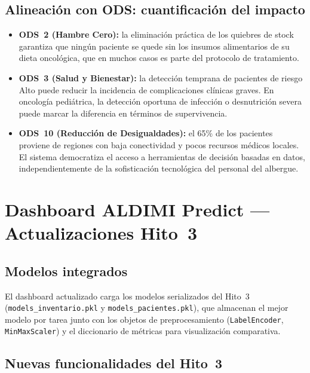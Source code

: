 \documentclass[12pt, a4paper]{article}
\begin{document}
\subsection{Alineaci\'on con ODS: cuantificaci\'on del impacto}

\begin{itemize}[leftmargin=1.5em, itemsep=4pt]
  \item \textbf{ODS~2 (Hambre Cero):} la eliminaci\'on pr\'actica de los quiebres de stock garantiza que ning\'un paciente se quede sin los insumos alimentarios de su dieta oncol\'ogica, que en muchos casos es parte del protocolo de tratamiento.
  \item \textbf{ODS~3 (Salud y Bienestar):} la detecci\'on temprana de pacientes de riesgo Alto puede reducir la incidencia de complicaciones cl\'inicas graves. En oncolog\'ia pedi\'atrica, la detecci\'on oportuna de infecci\'on o desnutrici\'on severa puede marcar la diferencia en t\'erminos de supervivencia.
  \item \textbf{ODS~10 (Reducci\'on de Desigualdades):} el 65\% de los pacientes proviene de regiones con baja conectividad y pocos recursos m\'edicos locales. El sistema democratiza el acceso a herramientas de decisi\'on basadas en datos, independientemente de la sofisticaci\'on tecnol\'ogica del personal del albergue.
\end{itemize}

\newpage

\section{Dashboard ALDIMI Predict --- Actualizaciones Hito~3}

\subsection{Modelos integrados}

El dashboard actualizado carga los modelos serializados del Hito~3 (\texttt{models\_inventario.pkl} y \texttt{models\_pacientes.pkl}), que almacenan el mejor modelo por tarea junto con los objetos de preprocesamiento (\texttt{LabelEncoder}, \texttt{MinMaxScaler}) y el diccionario de m\'etricas para visualizaci\'on comparativa.

\subsection{Nuevas funcionalidades del Hito~3}
\end{document}
